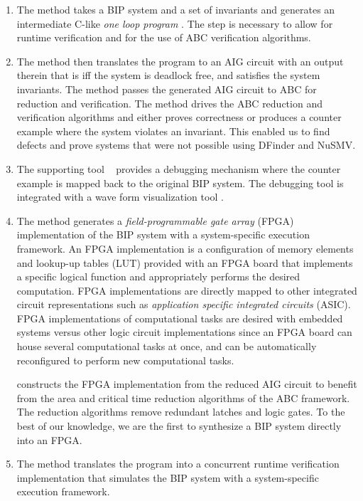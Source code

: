 \begin{enumerate}
\item The method takes a BIP system and a set of invariants and generates 
  an intermediate C-like {\em one loop program } \caig. 
  The \caig step is necessary to allow for runtime verification and for the use
  of ABC verification algorithms. 

\item The method then translates the \caig program to 
  an AIG circuit with an output therein that is \true iff the system 
  is deadlock free, and satisfies the system invariants. 
  The method passes the generated AIG circuit to ABC for reduction and 
  verification. 
  The method drives the ABC reduction and verification algorithms and 
  either proves correctness or produces a counter example where the 
  system violates an invariant. 
  This enabled us to find defects and prove systems that were not 
  possible using DFinder and NuSMV. 

\item  The supporting tool \biptool~ provides a debugging mechanism where the 
  counter example is mapped back to the original BIP system. 
  The debugging tool is integrated with a wave form visualization tool 
  \cite{bybell2010gtkwave}.  
\item The method generates a {\em field-programmable gate array} (FPGA) 
  implementation of the BIP system with a 
  system-specific execution framework. 
  An FPGA implementation is a configuration of 
  memory elements and lookup-up tables (LUT) provided with an FPGA board
  that implements a specific logical function
  and appropriately performs the desired computation. 
  FPGA implementations are directly mapped to other integrated circuit representations
  such as {\em application specific integrated circuits} (ASIC). 
  FPGA implementations of computational tasks are desired with embedded 
  systems versus other logic circuit implementations 
  since an FPGA board can house several computational tasks at once,
  and can be automatically reconfigured to perform new computational tasks. 

  \biptool{} constructs the FPGA implementation from the reduced AIG circuit 
  to benefit from the area and critical time reduction algorithms 
  of the ABC framework. 
  The reduction algorithms remove redundant latches and logic gates.  
  To the best of our knowledge, we are the first to synthesize a BIP system directly 
  into an FPGA. 

\item The method translates the \caig program into a concurrent runtime verification 
  implementation that simulates the BIP 
  system with a system-specific execution framework.
\end{enumerate}


